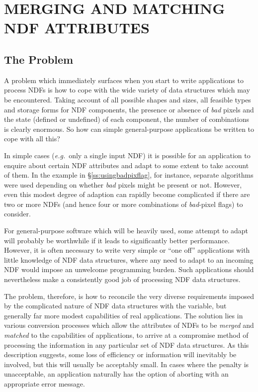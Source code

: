 \documentclass[twoside,11pt,nolof]{starlink}
\providecommand{\st}[1]{{\emph{#1}}}
\begin{document}
\section{MERGING AND MATCHING NDF ATTRIBUTES}

\subsection{The Problem}

A problem which immediately surfaces when you start to write applications to
process NDFs is how to cope with the wide variety of data structures which
may be encountered.
Taking account of all possible shapes and sizes, all feasible types and storage
forms for NDF components, the presence or absence of \st{bad\/} pixels and the
state (defined or undefined) of each component, the number of combinations is
clearly enormous.
So how can simple general-purpose applications be written to cope with all
this?

In simple cases (\st{e.g.}\ only a single input NDF) it is possible for an
application to enquire about certain NDF attributes and adapt to some extent
to take account of them.
In the example in \S\ref{ss:usingbadpixflag}, for instance, separate
algorithms were used depending on whether \st{bad\/} pixels might be present
or not.
However, even this modest degree of adaption can rapidly become complicated
if there are two or more NDFs (and hence four or more combinations of
\st{bad\/}-pixel flags) to consider.

For general-purpose software which will be heavily used, some attempt to
adapt will probably be worthwhile if it leads to significantly better
performance.
However, it is often necessary to write very simple or ``one off''
applications with little knowledge of NDF data structures, where any need to
adapt to an incoming NDF would impose an unwelcome programming burden.
Such applications should nevertheless make a consistently good job of
processing NDF data structures.

The problem, therefore, is how to reconcile the very diverse requirements
imposed by the complicated nature of NDF data structures with the variable,
but generally far more modest capabilities of real applications.
The solution lies in various conversion processes which allow the attributes
of NDFs to be \st{merged\/} and \st{matched\/} to the capabilities of
applications, to arrive at a compromise method of processing the information
in any particular set of NDF data structures.
As this description suggests, some loss of efficiency or information will
inevitably be involved, but this will usually be acceptably small.
In cases where the penalty is unacceptable, an application naturally has the
option of aborting with an appropriate error message.
\end{document}
